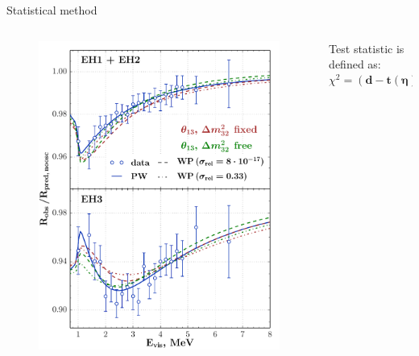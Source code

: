 \documentclass[usenames, dvipsnames]{beamer}
\begin{document}
\begin{frame}[fragile]
\begin{columns}[T]
\begin{column}{.47\textwidth}
\vspace{.3cm}
\begin{block}{Statistical method}
    \begin{columns}[T]
        \begin{column}{0.47\textwidth}
            \vspace*{-1cm}
            \begin{figure}
                \includegraphics[scale=1.22]{./pics/EH-ratio_5sigma-s_double-EH_bold.pdf}
            \end{figure}
        \end{column}
        \hspace*{1.5cm}
        \begin{column}{0.5\textwidth}
              Test statistic is defined as:
                    \begin{equation*}
                        \chi^2 = (\mathbf{d} -
                            \mathbf{t} (\boldsymbol{\eta}))^T V^{-1}(\mathbf{d} -
                            \mathbf{t} (\boldsymbol{\eta}))

\end{equation*}
\end{column}
\end{columns}
\end{block}
\end{column}
\end{columns}
\end{frame}
\end{document}
